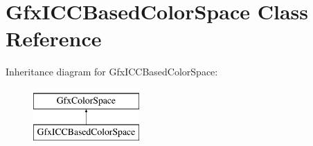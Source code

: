 \hypertarget{class_gfx_i_c_c_based_color_space}{}\section{Gfx\+I\+C\+C\+Based\+Color\+Space Class Reference}
\label{class_gfx_i_c_c_based_color_space}
Inheritance diagram for Gfx\+I\+C\+C\+Based\+Color\+Space\+:\begin{figure}[H]
\begin{center}
\leavevmode
\includegraphics[height=2.000000cm]{class_gfx_i_c_c_based_color_space}
\end{center}
\end{figure}
